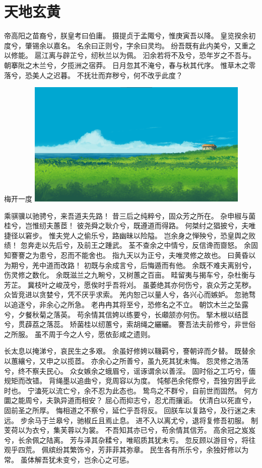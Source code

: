 \section{天地玄黄}
帝高阳之苗裔兮，朕皇考曰伯庸。
摄提贞于孟陬兮，惟庚寅吾以降。
皇览揆余初度兮，肇锡余以嘉名。
名余曰正则兮，字余曰灵均。
纷吾既有此内美兮，又重之以修能。
扈江离与辟芷兮，纫秋兰以为佩。
汩余若将不及兮，恐年岁之不吾与。
朝搴阰之木兰兮，夕揽洲之宿莽。
日月忽其不淹兮，春与秋其代序。
惟草木之零落兮，恐美人之迟暮。
不抚壮而弃秽兮，何不改乎此度？

\begin{customfigure}{梅开一度}
	\includegraphics[width=0.8\textwidth]{figures/test2.png} %
\end{customfigure}

乘骐骥以驰骋兮，来吾道夫先路！
昔三后之纯粹兮，固众芳之所在。
杂申椒与菌桂兮，岂惟纫夫蕙茝！
彼尧舜之耿介兮，既遵道而得路。
何桀纣之猖披兮，夫唯捷径以窘步。
惟夫党人之偷乐兮，路幽昧以险隘。
岂余身之惮殃兮，恐皇舆之败绩！
忽奔走以先后兮，及前王之踵武。
荃不查余之中情兮，反信谗而齌怒。
余固知謇謇之为患兮，忍而不能舍也。
指九天以为正兮，夫唯灵修之故也。
曰黄昏以为期兮，羌中道而改路！
初既与余成言兮，后悔遁而有他。
余既不难夫离别兮，伤灵修之数化。
余既滋兰之九畹兮，又树蕙之百亩。
畦留夷与揭车兮，杂杜衡与芳芷。
冀枝叶之峻茂兮，愿俟时乎吾将刈。
虽萎绝其亦何伤兮，哀众芳之芜秽。
众皆竞进以贪婪兮，凭不厌乎求索。
羌内恕己以量人兮，各兴心而嫉妒。
忽驰骛以追逐兮，非余心之所急。
老冉冉其将至兮，恐修名之不立。
朝饮木兰之坠露兮，夕餐秋菊之落英。
苟余情其信姱以练要兮，长顑颔亦何伤。
掔木根以结茝兮，贯薜荔之落蕊。
矫菌桂以纫蕙兮，索胡绳之纚纚。
謇吾法夫前修兮，非世俗之所服。
虽不周于今之人兮，愿依彭咸之遗则。

长太息以掩涕兮，哀民生之多艰。
余虽好修姱以鞿羁兮，謇朝谇而夕替。
既替余以蕙纕兮，又申之以揽茝。
亦余心之所善兮，虽九死其犹未悔。
怨灵修之浩荡兮，终不察夫民心。
众女嫉余之蛾眉兮，谣诼谓余以善淫。
固时俗之工巧兮，偭规矩而改错。
背绳墨以追曲兮，竞周容以为度。
忳郁邑余侘傺兮，吾独穷困乎此时也。
宁溘死以流亡兮，余不忍为此态也。
鸷鸟之不群兮，自前世而固然。
何方圜之能周兮，夫孰异道而相安？
屈心而抑志兮，忍尤而攘诟。
伏清白以死直兮，固前圣之所厚。
悔相道之不察兮，延伫乎吾将反。
回朕车以复路兮，及行迷之未远。
步余马于兰皋兮，驰椒丘且焉止息。
进不入以离尤兮，退将复修吾初服。
制芰荷以为衣兮，集芙蓉以为裳。
不吾知其亦已兮，苟余情其信芳。
高余冠之岌岌兮，长余佩之陆离。
芳与泽其杂糅兮，唯昭质其犹未亏。
忽反顾以游目兮，将往观乎四荒。
佩缤纷其繁饰兮，芳菲菲其弥章。
民生各有所乐兮，余独好修以为常。
虽体解吾犹未变兮，岂余心之可惩\cite{JiangShuZhen2025,johnke2025,li2025a}。

